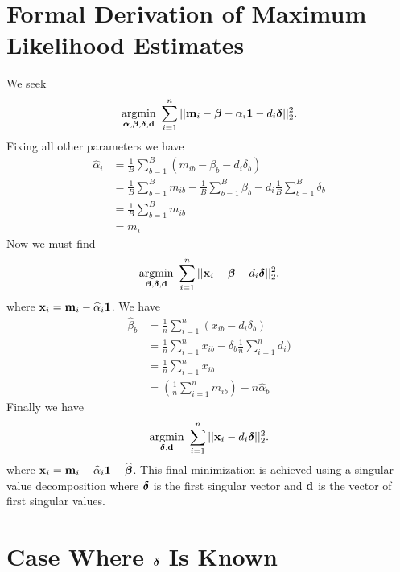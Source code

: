 \documentclass[12pt]{article}
\newcommand{\argmin}[1]{\underset{#1}{\operatorname{argmin}}\text{ }}
\newcommand{\V}[1]{{\bm{\mathbf{\MakeLowercase{#1}}}}} %
\begin{document}
\section{Formal Derivation of Maximum Likelihood Estimates}

We seek
\begin{equation*}
\argmin{\V{\alpha},\V{\beta},\V{\delta},\V{d}} \sum_{i=1}^n || \V{m}_i - \V{\beta} - \alpha_i\V{1} - d_i\V{\delta}||_2^2.
\end{equation*}
Fixing all other parameters we have
\begin{align*}
\widehat{\alpha}_i &= \frac{1}{B} \sum_{b=1}^B (m_{ib} - \beta_{b} - d_i\delta_b)\\
&= \frac{1}{B} \sum_{b=1}^B m_{ib} - \frac{1}{B}\sum_{b=1}^B \beta_{b} - d_i\frac{1}{B}\sum_{b=1}^B\delta_b\\
&= \frac{1}{B} \sum_{b=1}^B m_{ib}\\
&= \bar{m}_i
\end{align*}
Now we must find
\begin{equation*}
\argmin{\V{\beta},\V{\delta},\V{d}} \sum_{i=1}^n || \V{x}_i - \V{\beta} - d_i\V{\delta}||_2^2.
\end{equation*}
where $\V{x}_i = \V{m}_{i} - \widehat{\alpha}_i\V{1}$. We have
\begin{align*}
\widehat{\beta}_b &= \frac{1}{n}\sum_{i=1}^n (x_{ib} - d_i\delta_b)\\
&= \frac{1}{n}\sum_{i=1}^n x_{ib} - \delta_b \frac{1}{n} \sum_{i=1}^n d_i)\\
&= \frac{1}{n}\sum_{i=1}^n x_{ib}\\
&= \left(\frac{1}{n}\sum_{i=1}^n m_{ib}\right) - n\widehat{\alpha}_b
\end{align*}
Finally we have
\begin{equation*}
\argmin{\V{\delta},\V{d}} \sum_{i=1}^n || \V{x}_i - d_i\V{\delta}||_2^2.
\end{equation*}
where $\V{x}_i = \V{m}_{i} - \widehat{\alpha}_i\V{1} - \widehat{\V{\beta}}$. This final minimization is achieved using a singular value decomposition where $\V{\delta}$ is the first singular vector and $\V{d}$ is the vector of first singular values.



\section{Case Where $\V{\delta}$ Is Known}
\end{document}
